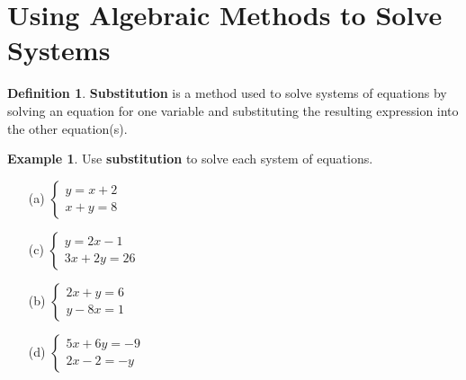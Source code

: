 \documentclass{report}
\theoremstyle{definition}
\newtheorem{example}{\bf Example}
\newtheorem{definition}{\bf Definition}[section]
\begin{document}
 \section{  Using Algebraic Methods to Solve Systems  }
 \setcounter{example}{0}
 \setcounter{definition}{0}
 \begin{definition}
	\textbf{Substitution} is a method used to solve systems of equations by solving an equation for one variable and substituting the resulting expression into the other equation(s). 
 \end{definition}


\begin{example}
     Use \textbf{substitution} to solve each system of equations.
\end{example}
%
\vspace{-0.5cm}
\hspace{-0.5cm}
%
\begin{minipage}{0.45\linewidth}
 \begin{itemize}
     \item[(a)]
        $\begin{cases}
            y=x+2 \\
            x+y=8
        \end{cases}$\\
 \end{itemize}
%
\vspace{2.55cm}
%
 \begin{itemize}
     \item[(c)]
        $\begin{cases}
            y=2x-1 \\
            3x+2y=26
        \end{cases}$\\
 \end{itemize}
%
\vspace{2.55cm}
%
\end{minipage}
\hspace{1.5cm}
\begin{minipage}{0.45\linewidth}
 \begin{itemize}
     \item[(b)]
        $\begin{cases}
            2x+y=6 \\
            y-8x=1
        \end{cases}$\\
 \end{itemize}
%
\vspace{2.55cm}
%
 \begin{itemize}
     \item[(d)]
        $\begin{cases}
            5x+6y=-9 \\
            2x-2=-y
        \end{cases}$\\
 \end{itemize}
%
\vspace{2.55cm}
%
\end{minipage}
\end{document}
